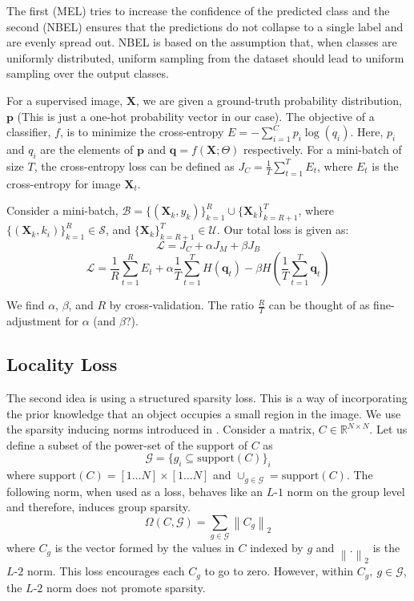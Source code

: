 \documentclass[runningheads]{llncs}
\begin{document}
The first (MEL) tries to increase the confidence of the predicted class and the second (NBEL)
ensures that the predictions do not collapse to a single label and are evenly spread out. NBEL
is based on the assumption that, when classes are uniformly distributed, uniform sampling from the
dataset should lead to uniform sampling over the output classes.

For a supervised image, $\textbf{X}$, we are given a ground-truth probability distribution, $\mathbf{p}$ (This is
just a one-hot probability vector in our case). The objective of a classifier, $f$, is to minimize the
cross-entropy $E = -\sum_{i=1}^{C}p_i \log(q_i)$. Here, $p_i$ and $q_i$
are the elements of $\mathbf{p}$ and $\mathbf{q} = f(\mathbf{X}; \Theta)$ respectively. For a
mini-batch of size $T$, the cross-entropy loss can be defined as $J_C = \frac{1}{T} \sum_{t=1}^{T}
E_t$, where $E_t$ is the cross-entropy for image $\mathbf{X}_t$.

Consider a mini-batch, $\mathcal{B} =
\{(\mathbf{X}_k, y_k)\}_{k=1}^R \cup \{\mathbf{X}_k\}_{k=R+1}^T$, where $\{(\mathbf{X}_k,
k_i)\}_{k=1}^{R} \in \mathcal{S}$, and $\{\mathbf{X}_k\}_{k=R+1}^{T} \in \mathcal{U}$. Our total loss
is given as:
\begin{equation}
	\mathcal{L} = J_C + \alpha J_M + \beta J_B
\end{equation}
\begin{equation}
	\mathcal{L} = \frac{1}{R} \sum_{t=1}^{R} E_t + \alpha \frac{1}{T}\sum_{t=1}^{T}H(\mathbf{q}_t) -
	\beta H(\frac{1}{T}\sum_{t=1}^{T}\mathbf{q}_t)
\end{equation}

We find $\alpha$, $\beta$, and $R$ by cross-validation. The ratio $\frac{R}{T}$ can be thought of as
fine-adjustment for $\alpha$ (and $\beta$?).


\subsection{Locality Loss}
The second idea is using a structured sparsity loss. This is a way of incorporating the prior knowledge
that an object occupies a small region in the image. We use the sparsity inducing norms introduced in
\cite{groupsparsity,sparsepca}. Consider a matrix, $C \in \mathbb{R}^{N \times
N}$. Let us define a subset of the power-set of the support of $C$ as
\begin{equation}
	\mathcal{G} = \{g_i \subseteq \textrm{support}(C)\}_i
\end{equation}
where $\textrm{support}(C) = [1 \dots N] \times [1 \dots N]$ and $\cup_{g \in \mathcal{G}} = \textrm{support}(C)$. The following norm, when used as a
loss, behaves like an $L$-$1$ norm on the group level and therefore, induces group sparsity.
\begin{equation}
	\Omega (C, \mathcal{G}) = \sum_{g \in \mathcal{G}} \left\lVert C_g \right\rVert _2
\end{equation}
where $C_g$ is the vector formed by the values in $C$ indexed by $g$ and $\left\lVert . \right\rVert_2$ is
the $L$-$2$ norm. This loss encourages each $C_g$ to go to zero. However, within $C_g,~g
\in \mathcal{G}$, the $L$-$2$ norm does not promote sparsity.
\end{document}
